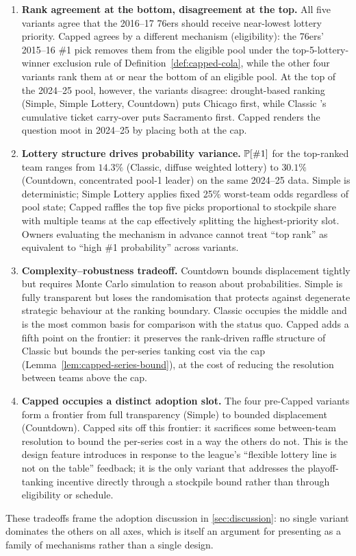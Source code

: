 \begin{enumerate}
    \item \textbf{Rank agreement at the bottom, disagreement at the top.} All five variants agree that the 2016--17 76ers should receive near-lowest lottery priority. Capped \cola{} agrees by a different mechanism (eligibility): the 76ers' 2015--16 \#1 pick removes them from the eligible pool under the top-5-lottery-winner exclusion rule of Definition~\ref{def:capped-cola}, while the other four variants rank them at or near the bottom of an eligible pool. At the top of the 2024--25 pool, however, the variants disagree: drought-based ranking (Simple, Simple Lottery, Countdown) puts Chicago first, while Classic \cola{}'s cumulative ticket carry-over puts Sacramento first. Capped \cola{} renders the question moot in 2024--25 by placing both at the cap.
    \item \textbf{Lottery structure drives probability variance.} $\mathbb{P}[\#1]$ for the top-ranked team ranges from $14.3\%$ (Classic, diffuse weighted lottery) to $30.1\%$ (Countdown, concentrated pool-1 leader) on the same 2024--25 data. Simple \cola{} is deterministic; Simple Lottery applies fixed 25\% worst-team odds regardless of pool state; Capped \cola{} raffles the top five picks proportional to stockpile share with multiple teams at the cap effectively splitting the highest-priority slot. Owners evaluating the mechanism in advance cannot treat ``top rank'' as equivalent to ``high \#1 probability'' across variants.
    \item \textbf{Complexity--robustness tradeoff.} Countdown \cola{} bounds displacement tightly but requires Monte Carlo simulation to reason about probabilities. Simple \cola{} is fully transparent but loses the randomisation that protects against degenerate strategic behaviour at the ranking boundary. Classic \cola{} occupies the middle and is the most common basis for comparison with the status quo. Capped \cola{} adds a fifth point on the frontier: it preserves the rank-driven raffle structure of Classic but bounds the per-series tanking cost via the cap (Lemma~\ref{lem:capped-series-bound}), at the cost of reducing the resolution between teams above the cap.
    \item \textbf{Capped \cola{} occupies a distinct adoption slot.} The four pre-Capped variants form a frontier from full transparency (Simple) to bounded displacement (Countdown). Capped \cola{} sits off this frontier: it sacrifices some between-team resolution to bound the per-series cost in a way the others do not. This is the design feature \citet{highley2026solvable5} introduces in response to the league's ``flexible lottery line is not on the table'' feedback; it is the only variant that addresses the playoff-tanking incentive directly through a stockpile bound rather than through eligibility or schedule.
\end{enumerate}

These tradeoffs frame the adoption discussion in \cref{sec:discussion}: no single variant dominates the others on all axes, which is itself an argument for presenting \cola{} as a family of mechanisms rather than a single design.
